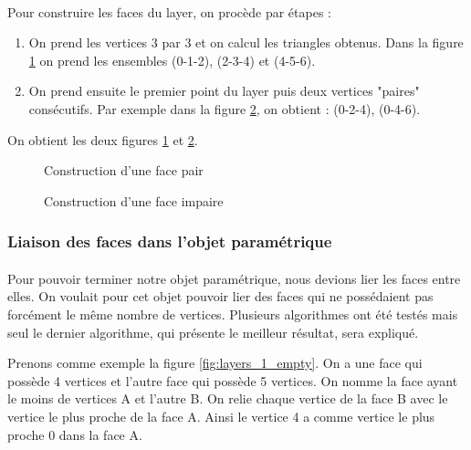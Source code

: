 \documentclass[article, backcover, french, nodocumentinfo]{upmethodology-document}
\begin{document}
	\paragraph{} Pour construire les faces du layer, on procède par étapes : 
	\begin{enumerate}
		\item On prend les vertices 3 par 3 et on calcul les triangles obtenus. Dans la figure \ref{fig:face_1} on prend les ensembles (0-1-2), (2-3-4) et (4-5-6).
		\item On prend ensuite le premier point du layer puis deux vertices "paires" consécutifs. Par exemple dans la figure \ref{fig:face_2}, on obtient : (0-2-4), (0-4-6).
	\end{enumerate}
	On obtient les deux figures \ref{fig:face_1} et \ref{fig:face_2}.
	\begin{figure}[H]
			\centering%
			\caption{Construction d'une face pair}%
			\label{fig:face_1}%
	\end{figure}
	\begin{figure}[H]
			\centering%
			\caption{Construction d'une face impaire}%
			\label{fig:face_2}%
	\end{figure}
	\subsubsection{Liaison des faces dans l'objet paramétrique}
		\paragraph{} Pour pouvoir terminer notre objet paramétrique, nous devions lier les faces entre elles. On voulait pour cet objet pouvoir lier des faces qui ne possédaient pas forcément le même nombre de vertices. Plusieurs algorithmes ont été testés mais seul le dernier algorithme, qui présente le meilleur résultat, sera expliqué.
		
		Prenons comme exemple la figure \ref{fig:layers_1_empty}. On a une face qui possède 4 vertices et l'autre face qui possède 5 vertices. On nomme la face ayant le moins de vertices A et l'autre B. On relie chaque vertice de la face B avec le vertice le plus proche de la face A. Ainsi le vertice 4 a comme vertice le plus proche 0 dans la face A.
		
\end{document}
